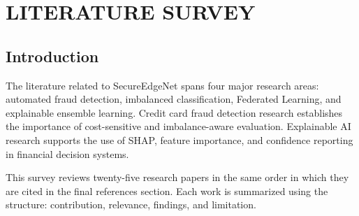 \chapter{LITERATURE SURVEY}
\section{Introduction}
The literature related to SecureEdgeNet spans four major research areas: automated fraud detection, imbalanced classification, Federated Learning, and explainable ensemble learning. Credit card fraud detection research establishes the importance of cost-sensitive and imbalance-aware evaluation. Explainable AI research supports the use of SHAP, feature importance, and confidence reporting in financial decision systems.

This survey reviews twenty-five research papers in the same order in which they are cited in the final references section. Each work is summarized using the structure: contribution, relevance, findings, and limitation.

